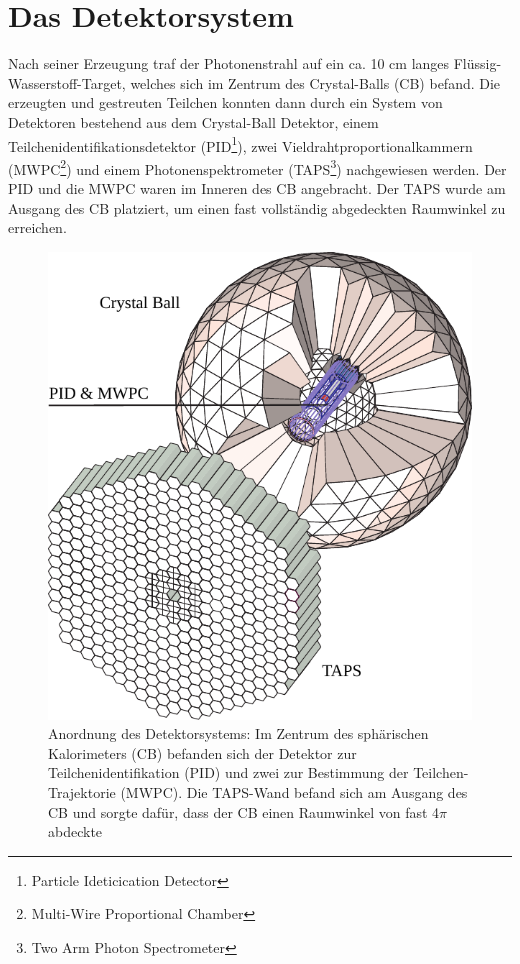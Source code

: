 \documentclass[a4paper,11pt,oneside,final,german,openbib,pdftex]{scrbook}
\begin{document}
{\section{Das Detektorsystem}
\label{sec:Das-Detektorsystem}
Nach seiner Erzeugung traf der Photonenstrahl auf ein ca. 10 cm langes Flüssig-Wasserstoff-Target, welches sich im Zentrum des Crystal-Balls (CB) befand. Die erzeugten und gestreuten Teilchen konnten dann durch ein System von Detektoren bestehend aus dem Crystal-Ball Detektor, einem Teilchenidentifikationsdetektor (PID\footnote{Particle Ideticication Detector}), zwei Vieldrahtproportionalkammern (MWPC\footnote{Multi-Wire Proportional Chamber}) und einem Photonenspektrometer (TAPS\footnote{Two Arm  Photon Spectrometer}) nachgewiesen werden. Der PID und die MWPC waren im Inneren des CB angebracht. Der TAPS wurde am Ausgang des CB platziert, um einen fast vollständig abgedeckten Raumwinkel zu erreichen.
\begin{figure}[h!]
	\begin{center}
		\includegraphics{crystal_ball}
	
		\caption{Anordnung des Detektorsystems: Im Zentrum des sph\"arischen Kalorimeters (CB) befanden sich der Detektor zur Teilchenidentifikation (PID) und zwei zur Bestimmung der Teilchen-Trajektorie (MWPC). Die TAPS-Wand befand sich am Ausgang des CB und sorgte daf\"ur, dass der CB einen Raumwinkel von fast 4$\pi$ abdeckte\cite{We13}}
		\label{[fig.crystal_ball]}	
\end{center}
\end{figure}

}
\end{document}
